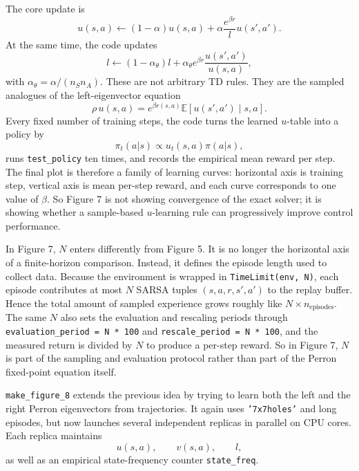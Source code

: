 \documentclass[11pt]{article}
\begin{document}
The core update is
\begin{equation}
    u(s,a)
    \leftarrow
    (1-\alpha)u(s,a) + \alpha \frac{e^{\beta r}}{l}u(s',a').
\end{equation}
At the same time, the code updates
\begin{equation}
    l
    \leftarrow
    (1-\alpha_\theta)l + \alpha_\theta e^{\beta r}\frac{u(s',a')}{u(s,a)},
\end{equation}
with \(\alpha_\theta = \alpha /(n_S n_A)\). These are not arbitrary TD rules. They are the
sampled analogues of the left-eigenvector equation
\begin{equation}
    \rho\,u(s,a)
    =
    e^{\beta r(s,a)}
    \mathbb{E}[u(s',a') \mid s,a].
\end{equation}
Every fixed number of training steps, the code turns the learned \(u\)-table into a policy by
\begin{equation}
    \pi_t(a|s)\propto u_t(s,a)\pi(a|s),
\end{equation}
runs \texttt{test\_policy} ten times, and records the empirical mean reward per step. The
final plot is therefore a family of learning curves: horizontal axis is training step,
vertical axis is mean per-step reward, and each curve corresponds to one value of \(\beta\).
So Figure 7 is not showing convergence of the exact solver; it is showing whether a
sample-based \(u\)-learning rule can progressively improve control performance.

In Figure 7, \(N\) enters differently from Figure 5. It is no longer the horizontal axis of a
finite-horizon comparison. Instead, it defines the episode length used to collect data. Because
the environment is wrapped in \texttt{TimeLimit(env, N)}, each episode contributes at most
\(N\) SARSA tuples \((s,a,r,s',a')\) to the replay buffer. Hence the total amount of sampled
experience grows roughly like \(N\times n_{\mathrm{episodes}}\). The same \(N\) also sets the
evaluation and rescaling periods through
\texttt{evaluation\_period = N * 100} and \texttt{rescale\_period = N * 100}, and the measured
return is divided by \(N\) to produce a per-step reward. So in Figure 7, \(N\) is part of the
sampling and evaluation protocol rather than part of the Perron fixed-point equation itself.

\medskip
\texttt{make\_figure\_8} extends the previous idea by trying to learn both the left and the
right Perron eigenvectors from trajectories. It again uses \texttt{'7x7holes'} and long
episodes, but now launches several independent replicas in parallel on CPU cores. Each replica
maintains
\begin{equation}
    u(s,a),\qquad v(s,a),\qquad l,
\end{equation}
as well as an empirical state-frequency counter \texttt{state\_freq}.
\end{document}
